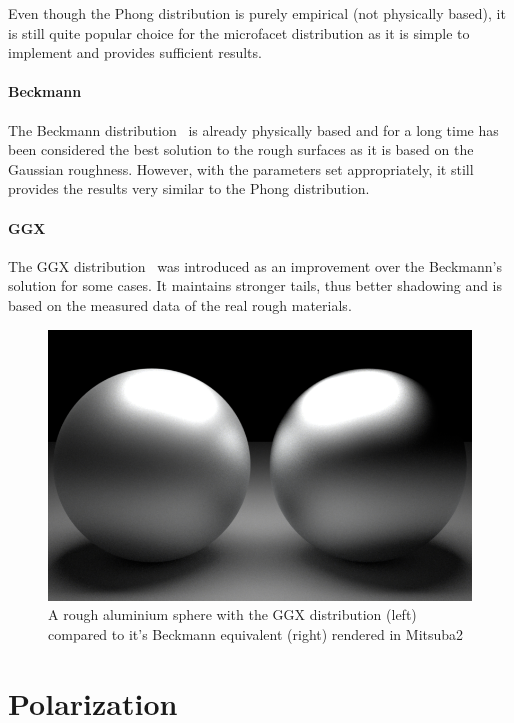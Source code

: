 Even though the Phong distribution is purely empirical (not physically based), it is still quite popular choice for the microfacet distribution as it is simple to implement and provides sufficient results.

\paragraph{Beckmann}

The Beckmann distribution~\cite{beckmann1987scattering} is already physically based and for a long time has been considered the best solution to the rough surfaces as it is based on the Gaussian roughness. However, with the parameters set appropriately, it still provides the results very similar to the Phong distribution.

\paragraph{GGX}

The GGX distribution~\cite{walter2007microfacet} was introduced as an improvement over the Beckmann's solution for some cases. It maintains stronger tails, thus better shadowing and is based on the measured data of the real rough materials.

\begin{figure}[h]
	\centering
	\includegraphics[width=.8\linewidth]{img/ggx_beckmann.png}
	\caption{A rough aluminium sphere with the GGX distribution (left) compared to it's Beckmann equivalent (right) rendered  in Mitsuba2}
	\label{fig:ggx_beckmann}
\end{figure}

\section{Polarization}
\label{sec:polarization}

